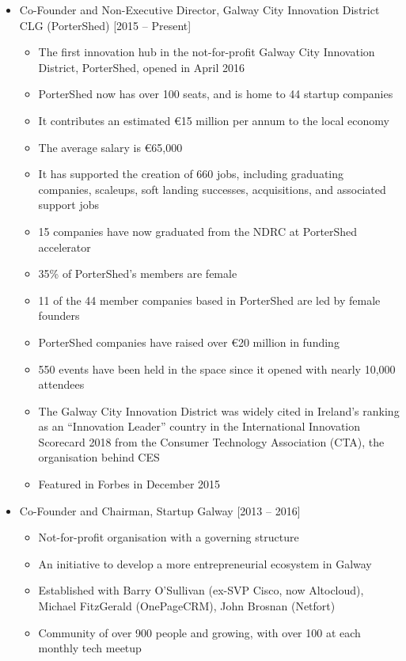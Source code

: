 \documentclass[10pt,a4paper]{res} %
\begin{document}
\begin{resume}
\begin{itemize} \itemsep -2pt
\item Co-Founder and Non-Executive Director, Galway City Innovation District CLG (PorterShed) [2015 -- Present]
\begin{itemize} \itemsep -2pt
\item The first innovation hub in the not-for-profit Galway City Innovation District, PorterShed, opened in April 2016
\item PorterShed now has over 100 seats, and is home to 44 startup companies
\item It contributes an estimated \euro{}15 million per annum to the local economy
\item The average salary is \euro{}65,000
\item It has supported the creation of 660 jobs, including graduating companies, scaleups, soft landing successes, acquisitions, and associated support jobs
\item 15 companies have now graduated from the NDRC at PorterShed accelerator
\item 35\% of PorterShed's members are female
\item 11 of the 44 member companies based in PorterShed are led by female founders
\item PorterShed companies have raised over \euro{}20 million in funding
\item 550 events have been held in the space since it opened with nearly 10,000 attendees
\item The Galway City Innovation District was widely cited in Ireland's ranking as an ``Innovation Leader'' country in the International Innovation Scorecard 2018 from the Consumer Technology Association (CTA), the organisation behind CES
\item Featured in Forbes in December 2015
\end{itemize}
\item Co-Founder and Chairman, Startup Galway [2013 -- 2016]
\begin{itemize} \itemsep -2pt
\item Not-for-profit organisation with a governing structure
\item An initiative to develop a more entrepreneurial ecosystem in Galway
\item Established with Barry O'Sullivan (ex-SVP Cisco, now Altocloud), Michael FitzGerald (OnePageCRM), John Brosnan (Netfort)
\item Community of over 900 people and growing, with over 100 at each monthly tech meetup

\end{itemize}
\end{itemize}
\end{resume}
\end{document}
